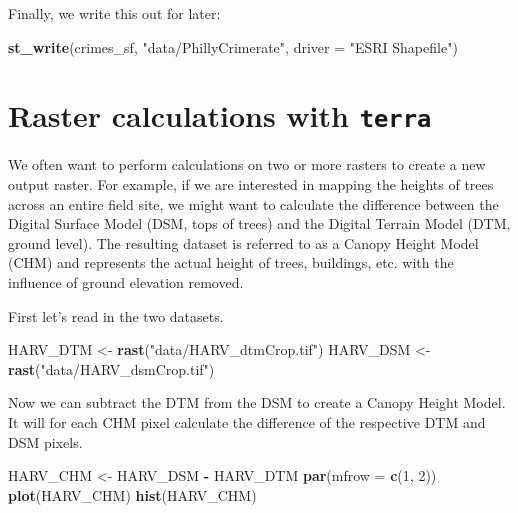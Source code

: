 \documentclass[
]{book}
\newenvironment{Shaded}{\begin{snugshade}}{\end{snugshade}}
\newcommand{\AttributeTok}[1]{\textcolor[rgb]{0.13,0.29,0.53}{#1}}
\newcommand{\DecValTok}[1]{\textcolor[rgb]{0.00,0.00,0.81}{#1}}
\newcommand{\FunctionTok}[1]{\textcolor[rgb]{0.13,0.29,0.53}{\textbf{#1}}}
\newcommand{\NormalTok}[1]{#1}
\newcommand{\OtherTok}[1]{\textcolor[rgb]{0.56,0.35,0.01}{#1}}
\newcommand{\SpecialCharTok}[1]{\textcolor[rgb]{0.81,0.36,0.00}{\textbf{#1}}}
\newcommand{\StringTok}[1]{\textcolor[rgb]{0.31,0.60,0.02}{#1}}
\begin{document}
Finally, we write this out for later:

\begin{Shaded}
\begin{Highlighting}[]
\FunctionTok{st\_write}\NormalTok{(crimes\_sf, }\StringTok{"data/PhillyCrimerate"}\NormalTok{, }\AttributeTok{driver =} \StringTok{"ESRI Shapefile"}\NormalTok{)}
\end{Highlighting}
\end{Shaded}

\section{\texorpdfstring{Raster calculations with \texttt{terra}}{Raster calculations with terra}}\label{raster-calculations-with-terra}

We often want to perform calculations on two or more rasters to create a new output raster. For example, if we are interested in mapping the heights of trees across an entire field site, we might want to calculate the difference between the Digital Surface Model (DSM, tops of trees) and the Digital Terrain Model (DTM, ground level). The resulting dataset is referred to as a Canopy Height Model (CHM) and represents the actual height of trees, buildings, etc. with the influence of ground elevation removed.

First let's read in the two datasets.

\begin{Shaded}
\begin{Highlighting}[]
\NormalTok{HARV\_DTM }\OtherTok{\textless{}{-}} \FunctionTok{rast}\NormalTok{(}\StringTok{"data/HARV\_dtmCrop.tif"}\NormalTok{)}
\NormalTok{HARV\_DSM }\OtherTok{\textless{}{-}} \FunctionTok{rast}\NormalTok{(}\StringTok{"data/HARV\_dsmCrop.tif"}\NormalTok{)}
\end{Highlighting}
\end{Shaded}

Now we can subtract the DTM from the DSM to create a Canopy Height Model. It will for each CHM pixel calculate the difference of the respective DTM and DSM pixels.

\begin{Shaded}
\begin{Highlighting}[]
\NormalTok{HARV\_CHM }\OtherTok{\textless{}{-}}\NormalTok{ HARV\_DSM }\SpecialCharTok{{-}}\NormalTok{ HARV\_DTM}
\FunctionTok{par}\NormalTok{(}\AttributeTok{mfrow =} \FunctionTok{c}\NormalTok{(}\DecValTok{1}\NormalTok{, }\DecValTok{2}\NormalTok{))}
\FunctionTok{plot}\NormalTok{(HARV\_CHM)}
\FunctionTok{hist}\NormalTok{(HARV\_CHM)}
\end{Highlighting}
\end{Shaded}
\end{document}
